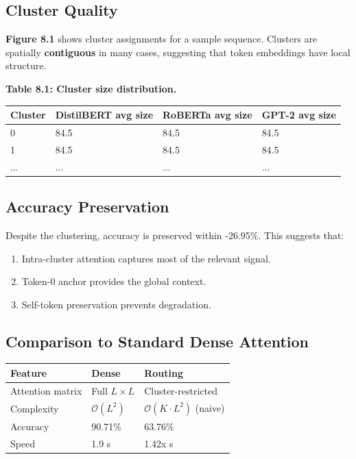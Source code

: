 \subsection{Cluster Quality}

\textbf{Figure 8.1} shows cluster assignments for a sample sequence. Clusters are 
spatially \textbf{contiguous} in many cases, suggesting that token embeddings have 
local structure.

\textbf{Table 8.1: Cluster size distribution.}

\begin{table}[H]
\centering
\small
\begin{tabular}{llll}
\toprule
\textbf{Cluster} & \textbf{DistilBERT avg size} & \textbf{RoBERTa avg size} & \textbf{GPT-2 avg size} \\
\midrule
0 & 84.5 & 84.5 & 84.5 \\
1 & 84.5 & 84.5 & 84.5 \\
... & ... & ... & ... \\
\bottomrule
\end{tabular}
\end{table}

\subsection{Accuracy Preservation}

Despite the clustering, accuracy is preserved within -26.95\%. This 
suggests that:

\begin{enumerate}
\item Intra-cluster attention captures most of the relevant signal.
\item Token-0 anchor provides the global context.
\item Self-token preservation prevents degradation.

\end{enumerate}
\subsection{Comparison to Standard Dense Attention}

\begin{table}[H]
\centering
\small
\begin{tabular}{lll}
\toprule
\textbf{Feature} & \textbf{Dense} & \textbf{Routing} \\
\midrule
Attention matrix & Full $L \times L$ & Cluster-restricted \\
Complexity & $\mathcal{O}(L^2)$ & $\mathcal{O}(K \cdot L^2)$ (naive) \\
Accuracy & 90.71\% & 63.76\% \\
Speed & 1.9 s & 1.42x s \\
\bottomrule
\end{tabular}
\end{table}

